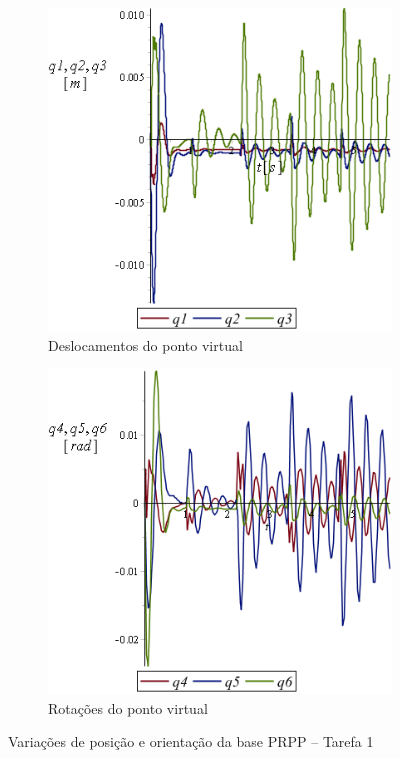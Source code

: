 \begin{figure}[h]
    \centering
    \begin{subfigure}[b]{0.48\textwidth}
        \includegraphics[width=\textwidth]{figs/t1_q123_base_prpp}
        \caption{Deslocamentos do ponto virtual}
        \label{fig::t1_q123_base_prpp}
    \end{subfigure}
    \quad %
    \begin{subfigure}[b]{0.48\textwidth}
        \includegraphics[width=\textwidth]{figs/t1_q456_base_prpp}
        \caption{Rotações do ponto virtual}
        \label{fig::t1_q456_base_prpp}
    \end{subfigure}
    \caption{Variações de posição e orientação da base PRPP -- Tarefa 1}
    \label{fig::t1_q123456_base_prpp}
\end{figure}

